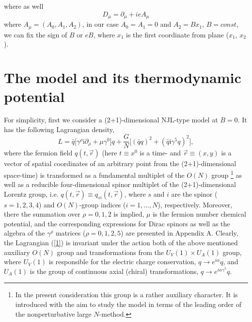 \documentclass[12pt,a4paper]{article}
\begin{document}
where as well
$$
D_{\mu}=\partial_{\mu}+ieA_{\mu}
$$
 where $A_{\mu}=(A_0,A_1,A_2)$, in our case $A_0=A_1=0$ and $A_2=Bx_1$, $B=const$, we can fix the sign of $B$ or $eB$, where $x_1$ is the first coordinate from plane ($x_1$, $x_2$).

\section{ The model and its thermodynamic potential}

For simplicity, first we consider a (2+1)-dimensional NJL-type model at $B=0$. It has the following Lagrangian density,
\begin{equation}
L=\bar q\Big [\gamma^\rho\mathrm{i}\partial_\rho
+\mu\gamma^0\Big ]q+ \frac {G}{N}\Big
[(\bar qq)^2+(\bar q\mathrm{i}\gamma^5 q)^2 \Big ],
\label{1}
\end{equation}
where the fermion field $q(t,\vec r)$ (here $t\equiv x^0$ is a time- and
$\vec r\equiv (x,y)$ is a vector of spatial coordinates of an arbitrary point from the
(2+1)-dimensional space-time) is transformed as a fundamental multiplet of the $O(N)$ group
\footnote{In the present consideration this group is a rather auxiliary character. It is introduced with the aim to study the model in terms of the leading order of the nonperturbative large $N$-method.}
as well as a reducible four-dimensional spinor multiplet of the (2+1)-dimensional Lorentz group,
i.e. $q(t,\vec r)\equiv q_{si}(t,\vec r)$, where $s$ and $i$ are the spinor ($s=1,2,3,4$) and
$O(N)$-group indices ($i=1,...,N$), respectively. Moreover, there the
summation over $\rho =0,1,2$ is implied, $\mu$ is the fermion number chemical potential, and the
corresponding expressions for Dirac spinors as well as the algebra of the
$\gamma^\rho$ matrices ($\rho=0,1,2,5$) are presented in Appendix A.  Clearly, the Lagrangian
(\ref{1}) is invariant under the action both of the above mentioned auxiliary $O(N)$ group and
transformations from the $U_V(1)\times U_A(1)$ group, where $U_V(1)$ is responsible for
the electric charge conservation, $q\to e^{i\alpha}q$, and $U_A(1)$ is the group of continuous
axial (chiral) transformations, $q\to e^{i\alpha\gamma^5}q$.
\end{document}
